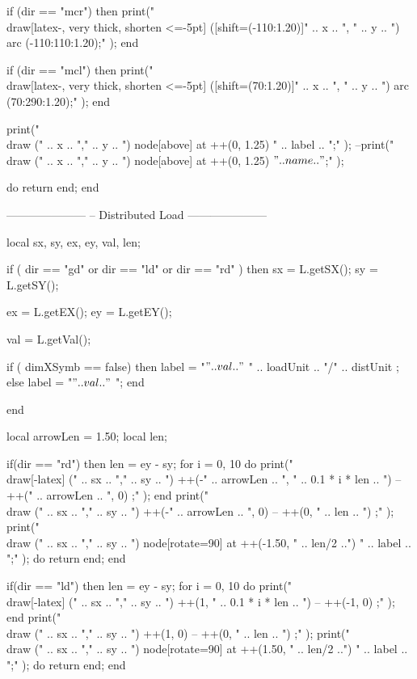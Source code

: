 \begin{luacode}
		if (dir == "mcr") then
			print("\\draw[latex-, very thick, shorten <=-5pt] ([shift=(-110:1.20)]" .. x .. ", " .. y .. ") arc (-110:110:1.20);" );
		end
		
		if (dir == "mcl") then
			print("\\draw[latex-, very thick, shorten <=-5pt] ([shift=(70:1.20)]" .. x .. ", " .. y .. ") arc (70:290:1.20);" );
		end
		
		
		print("\\draw (" .. x .. "," .. y .. ") node[above] at ++(0, 1.25) {" .. label .. "};" );
		--print("\\draw (" .. x .. "," .. y .. ") node[above] at ++(0, 1.25) {$" .. name .. "$};" );
		
		do return end;
	end

	---------------------
	-- Distributed Load
	---------------------
	
	local sx, sy, ex, ey, val, len;
		
	if ( dir == "gd" or dir == "ld" or dir == "rd" ) then
		sx = L.getSX();
		sy = L.getSY();
		
		ex = L.getEX();
		ey = L.getEY();
		
		val = L.getVal();
		
		if ( dimXSymb == false) then
			label = "$" .. val .. "$ " .. loadUnit .. "/" .. distUnit ;
		else
			label = "$" .. val .. "$ ";
		end
		
	end
	
	local arrowLen = 1.50;
	local len;
	
	if(dir == "rd") then
		len = ey - sy;
		for i = 0, 10 do
			print("\\draw[-latex] (" .. sx .. "," .. sy .. ") ++(-" .. arrowLen .. ", " .. 0.1 * i * len .. ") -- ++(" .. arrowLen .. ", 0) ;" );
		end
		print("\\draw (" .. sx .. "," .. sy .. ") ++(-" .. arrowLen .. ", 0) -- ++(0, " .. len .. ") ;" );
		print("\\draw (" .. sx .. "," .. sy .. ") node[rotate=90] at ++(-1.50, " .. len/2 ..") {" .. label .. "};" );
		do return end;
	end

	if(dir == "ld") then
		len = ey - sy;
		for i = 0, 10 do
			print("\\draw[-latex] (" .. sx .. "," .. sy .. ") ++(1, " .. 0.1 * i * len .. ") -- ++(-1, 0) ;" );
		end
		print("\\draw (" .. sx .. "," .. sy .. ") ++(1, 0) -- ++(0, " .. len .. ") ;" );
		print("\\draw (" .. sx .. "," .. sy .. ") node[rotate=90] at ++(1.50, " .. len/2 ..") {" .. label .. "};" );
		do return end;
	end
	

\end{luacode}
